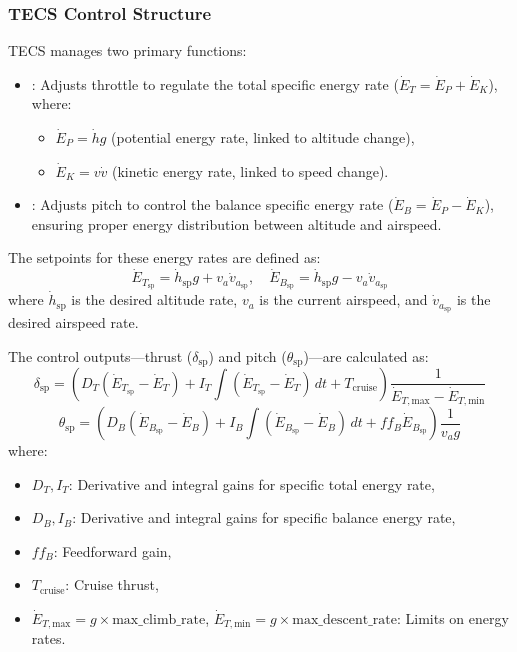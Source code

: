 \documentclass[journal,article,submit,pdftex,moreauthors]{Definitions/mdpi}
\begin{document}
\subsubsection{TECS Control Structure}
TECS manages two primary functions:
\begin{itemize}
    \item {}: Adjusts throttle to regulate the total specific energy rate (\(\dot{E}_T = \dot{E}_P + \dot{E}_K\)), where:
    \begin{itemize}
        \item \(\dot{E}_P = \dot{h}g\) (potential energy rate, linked to altitude change),
        \item \(\dot{E}_K = v\dot{v}\) (kinetic energy rate, linked to speed change).
    \end{itemize}
    \item {}: Adjusts pitch to control the balance specific energy rate (\(\dot{E}_B = \dot{E}_P - \dot{E}_K\)), ensuring proper energy distribution between altitude and airspeed.
\end{itemize}

The setpoints for these energy rates are defined as:
\begin{equation}
    \dot{E}_{T_{\text{sp}}} = \dot{h}_{\text{sp}}g + v_a\dot{v}_{a_{\text{sp}}}, \quad \dot{E}_{B_{\text{sp}}} = \dot{h}_{\text{sp}}g - v_a\dot{v}_{a_{\text{sp}}}
\end{equation}
where \(\dot{h}_{\text{sp}}\) is the desired altitude rate, \(v_a\) is the current airspeed, and \(\dot{v}_{a_{\text{sp}}}\) is the desired airspeed rate.

The control outputs—thrust (\(\delta_{\text{sp}}\)) and pitch (\(\theta_{\text{sp}}\))—are calculated as:
\begin{equation}
    \delta_{\text{sp}} = \left( D_T (\dot{E}_{T_{\text{sp}}} - \dot{E}_T) + I_T \int (\dot{E}_{T_{\text{sp}}} - \dot{E}_T) \, dt + T_{\text{cruise}} \right) \frac{1}{\dot{E}_{T,\text{max}} - \dot{E}_{T,\text{min}}}
\end{equation}
\begin{equation}
    \theta_{\text{sp}} = \left( D_B (\dot{E}_{B_{\text{sp}}} - \dot{E}_B) + I_B \int (\dot{E}_{B_{\text{sp}}} - \dot{E}_B) \, dt + ff_B \dot{E}_{B_{\text{sp}}} \right) \frac{1}{v_a g}
\end{equation}
where:
\begin{itemize}
    \item \(D_T, I_T\): Derivative and integral gains for specific total energy rate,
    \item \(D_B, I_B\): Derivative and integral gains for specific balance energy rate,
    \item \(ff_B\): Feedforward gain,
    \item \(T_{\text{cruise}}\): Cruise thrust,
    \item \(\dot{E}_{T,\text{max}} = g \times \text{max\_climb\_rate}\), \(\dot{E}_{T,\text{min}} = g \times \text{max\_descent\_rate}\): Limits on energy rates.
\end{itemize}
\end{document}
